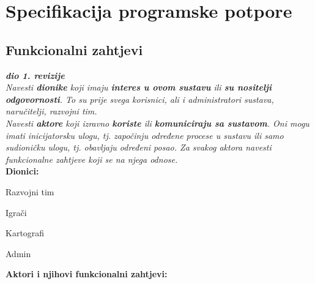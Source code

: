 \chapter{Specifikacija programske potpore}
		
	\section{Funkcionalni zahtjevi}
			
			\textbf{\textit{dio 1. revizije}}\\
			
			\textit{Navesti \textbf{dionike} koji imaju \textbf{interes u ovom sustavu} ili  \textbf{su nositelji odgovornosti}. To su prije svega korisnici, ali i administratori sustava, naručitelji, razvojni tim.}\\
				
			\textit{Navesti \textbf{aktore} koji izravno \textbf{koriste} ili \textbf{komuniciraju sa sustavom}. Oni mogu imati inicijatorsku ulogu, tj. započinju određene procese u sustavu ili samo sudioničku ulogu, tj. obavljaju određeni posao. Za svakog aktora navesti funkcionalne zahtjeve koji se na njega odnose.}\\
			
			
			\noindent \textbf{Dionici:}
			
			\begin{packed_enum}
				
				\item Razvojni tim
				\item Igrači				
				\item Kartografi
				\item Admin
				
			\end{packed_enum}
			
			\noindent \textbf{Aktori i njihovi funkcionalni zahtjevi:}
			
